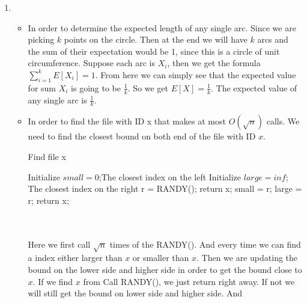 \documentclass[14pt]{article}
\begin{document}
\begin{enumerate}
    \item 
    \begin{itemize}
    \item In order to determine the expected length of any single arc. Since we
    are picking $k$ points on the circle. Then at the end we will have $k$ arcs 
    and the sum of their expectation would be 1, since this is a circle of unit 
    circumference. Suppose each arc is $X_i$, then we get the formula $\sum_{i=1}
    ^k E[X_i] = 1$. From here we can simply see that the expected value for sum 
    $X_i$ is going to be $\frac{1}{k}$. So we get $E[X] = \frac{1}{k}$. The 
    expected value of any single arc is $\frac{1}{k}$.
    \item In order to find the file with ID x that makes at most $O(\sqrt{n})$
    calls. We need to find the closest bound on both end of the file with ID $x$.\\
    \begin{minipage}{\linewidth}
            \begin{algorithm}[H]
              \caption{Find file x}
              \begin{algorithmic}[1]
                \State Initialize $small = 0$;\Comment The closest index on the left
                \State Initialize $large = inf$; \Comment The closest index on the right
                    \State r = RANDY();
                        return x;
                    \EndIf
                        small = r;
                    \EndIf
                        large = r;
                    \EndIf
                \EndFor
                        \State return x;
                    \EndIf
                \EndFor
              \end{algorithmic}
            \end{algorithm}
        \end{minipage}\\\\
    Here we first call $\sqrt{n}$ times of the RANDY(). And every time we can find
    a index either larger than $x$ or smaller than $x$. Then we are updating the bound 
    on the lower side and higher side in order to get the bound close to $x$. If
    we find $x$ from Call RANDY(), we just return right away. If not we will still
    get the bound on lower side and higher side. And

\end{itemize}
\end{enumerate}
\end{document}
